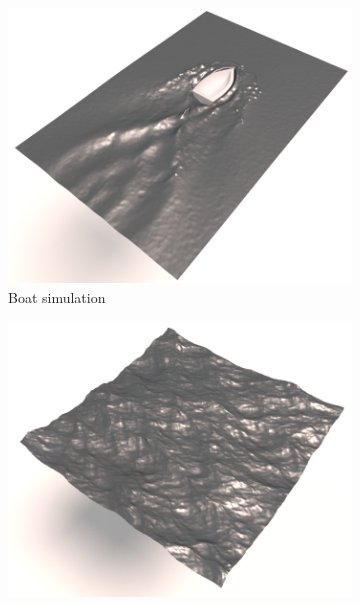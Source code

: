 \begin{figure}[!h]
	\centering
	\begin{subfigure}[b]{0.40\linewidth}
		\centering
		\includegraphics[width=\textwidth]{images/fluidsculpting-mig2016/results/boatTraversal.png}
		\caption{\label{fig:result_detail:boat}\scriptsize{Boat simulation}}
	\end{subfigure}
	\hspace{0.1cm}
	\begin{subfigure}[b]{0.40\linewidth}
		\centering
		\includegraphics[width=\textwidth]{images/fluidsculpting-mig2016/results/highResOcean.png}

\end{subfigure}
\end{figure}
